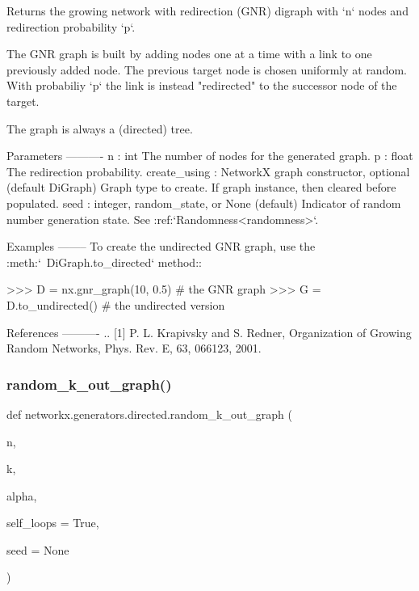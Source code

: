 \begin{DoxyVerb}Returns the growing network with redirection (GNR) digraph with `n`
nodes and redirection probability `p`.

The GNR graph is built by adding nodes one at a time with a link to one
previously added node.  The previous target node is chosen uniformly at
random.  With probabiliy `p` the link is instead "redirected" to the
successor node of the target.

The graph is always a (directed) tree.

Parameters
----------
n : int
    The number of nodes for the generated graph.
p : float
    The redirection probability.
create_using : NetworkX graph constructor, optional (default DiGraph)
    Graph type to create. If graph instance, then cleared before populated.
seed : integer, random_state, or None (default)
    Indicator of random number generation state.
    See :ref:`Randomness<randomness>`.

Examples
--------
To create the undirected GNR graph, use the :meth:`~DiGraph.to_directed`
method::

>>> D = nx.gnr_graph(10, 0.5)  # the GNR graph
>>> G = D.to_undirected()  # the undirected version

References
----------
.. [1] P. L. Krapivsky and S. Redner,
       Organization of Growing Random Networks,
       Phys. Rev. E, 63, 066123, 2001.
\end{DoxyVerb}
 \mbox{\label{namespacenetworkx_1_1generators_1_1directed_a2b7a269e4dde527be1d0c6a8ba3b0c19}} 
\subsubsection{\texorpdfstring{random\+\_\+k\+\_\+out\+\_\+graph()}{random\_k\_out\_graph()}}
{\footnotesize\ttfamily def networkx.\+generators.\+directed.\+random\+\_\+k\+\_\+out\+\_\+graph (\begin{DoxyParamCaption}\item[{}]{n,  }\item[{}]{k,  }\item[{}]{alpha,  }\item[{}]{self\+\_\+loops = {\ttfamily True},  }\item[{}]{seed = {\ttfamily None} }\end{DoxyParamCaption})}

